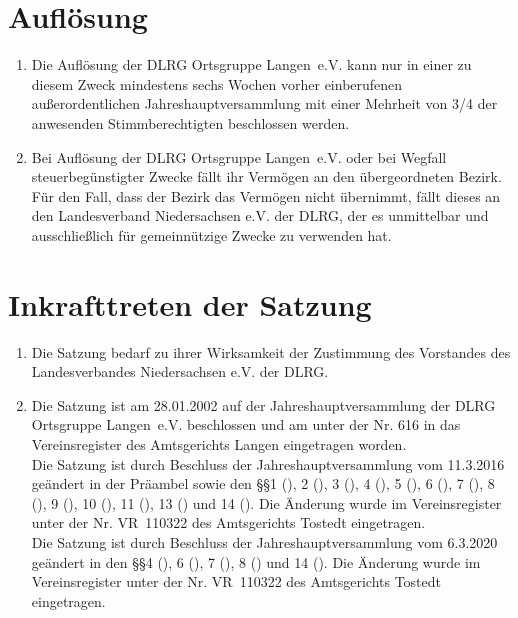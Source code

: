 \documentclass[%
12pt, %
a4paper, %
headsepline, %
parskip, %
headings=normal, %
]{scrreprt}
\begin{document}
\section{Auflösung}
\label{sec:aufloesung}
\begin{enumerate}
    \item Die Auflösung der DLRG Ortsgruppe Langen~e.V. kann nur in einer zu diesem Zweck mindestens sechs Wochen vorher einberufenen außerordentlichen Jahreshauptversammlung mit einer Mehrheit von 3/4 der anwesenden Stimmberechtigten beschlossen werden.
    \item Bei Auflösung der DLRG Ortsgruppe Langen~e.V. oder bei Wegfall steuerbegünstigter Zwecke fällt ihr Vermögen an den übergeordneten Bezirk. Für den Fall, dass der Bezirk das Vermögen nicht übernimmt, fällt dieses an den Landesverband Niedersachsen e.V. der DLRG, der es unmittelbar und ausschließlich für gemeinnützige Zwecke zu verwenden hat.
\end{enumerate}

\section{Inkrafttreten der Satzung}
\label{sec:inkrafttreten}
\begin{enumerate}
    \item Die Satzung bedarf zu ihrer Wirksamkeit der Zustimmung des Vorstandes des Landesverbandes Niedersachsen e.V. der DLRG.
    \item Die Satzung ist am 28.01.2002 auf der Jahreshauptversammlung der DLRG Ortsgruppe Langen~e.V. beschlossen und am \hspace{1.5cm} unter der Nr. 616 in das Vereinsregister des Amtsgerichts Langen eingetragen worden.\\
      Die Satzung ist durch Beschluss der Jahreshauptversammlung vom 11.3.2016 geändert in der Präambel sowie den \S\S 1 (), 2 (), 3 (), 4 (), 5 (), 6 (), 7 (), 8 (), 9 (), 10 (), 11 (), 13 () und 14 (). Die Änderung wurde im Vereinsregister unter der Nr. VR~110322 des Amtsgerichts Tostedt eingetragen.\\
      Die Satzung ist durch Beschluss der Jahreshauptversammlung vom 6.3.2020 geändert in den \S\S 4 (), 6 (), 7 (), 8 () und 14 (). Die Änderung wurde im Vereinsregister unter der Nr. VR~110322 des Amtsgerichts Tostedt eingetragen.
\end{enumerate}
\end{document}
